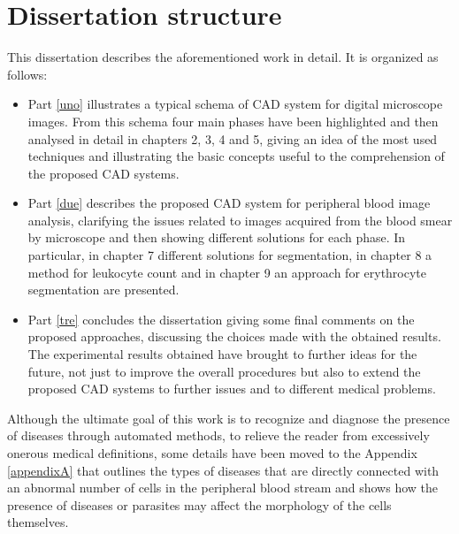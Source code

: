 \documentclass[final,a4paper,12pt,english]{UnicaPhdThesis3}
\begin{document}
\section{Dissertation structure} %
This dissertation describes the aforementioned work in detail. It is organized as follows:
\begin{itemize}
\item Part \ref{uno} illustrates a typical schema of CAD system for digital microscope images. From this schema four main phases have been highlighted and then analysed in detail in chapters 2, 3, 4 and 5, giving an idea of the most used techniques and illustrating the basic concepts useful to the comprehension of the proposed CAD systems. 

\item Part \ref{due} describes the proposed CAD system for peripheral blood image analysis, clarifying the issues related to images acquired from the blood smear by microscope and then showing different solutions for each phase. In particular, in chapter 7 different solutions for segmentation, in chapter 8 a method for leukocyte count and in chapter 9 an approach for erythrocyte segmentation are presented.
 
\item Part \ref{tre} concludes the dissertation giving some final comments on the proposed approaches, discussing the choices made with the obtained results. The experimental results obtained have brought to further ideas for the future, not just to improve the overall procedures but also to extend the proposed CAD systems to further issues and to different medical problems. 
\end{itemize}
Although the ultimate goal of this work is to recognize and diagnose the presence of diseases through automated methods, to relieve the reader from excessively onerous medical definitions, some details have been moved to the Appendix \ref{appendixA} that outlines the types of diseases that are directly connected with an abnormal number of cells in the peripheral blood stream and shows how the presence of diseases or parasites may affect the morphology of the cells themselves.
\end{document}
